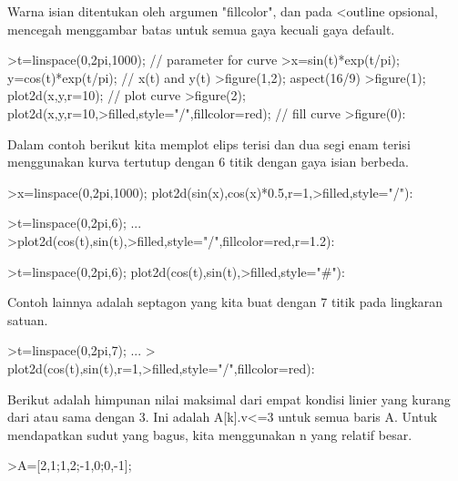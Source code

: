 \documentclass[a4paper,10pt]{article}
\begin{document}
\begin{eulernotebook}
\begin{eulercomment}
\begin{eulercomment}
\begin{eulercomment}
\begin{eulercomment}
\begin{eulercomment}
\begin{eulercomment}
\begin{eulercomment}
Warna isian ditentukan oleh argumen "fillcolor", dan pada \textless{}outline
opsional, mencegah menggambar batas untuk semua gaya kecuali gaya
default.
\end{eulercomment}
\begin{eulerprompt}
>t=linspace(0,2pi,1000); // parameter for curve
>x=sin(t)*exp(t/pi); y=cos(t)*exp(t/pi); // x(t) and y(t)
>figure(1,2); aspect(16/9)
>figure(1); plot2d(x,y,r=10); // plot curve
>figure(2); plot2d(x,y,r=10,>filled,style="/",fillcolor=red); // fill curve
>figure(0):
\end{eulerprompt}
\begin{eulercomment}
Dalam contoh berikut kita memplot elips terisi dan dua segi enam
terisi menggunakan kurva tertutup dengan 6 titik dengan gaya isian
berbeda.
\end{eulercomment}
\begin{eulerprompt}
>x=linspace(0,2pi,1000); plot2d(sin(x),cos(x)*0.5,r=1,>filled,style="/"):
\end{eulerprompt}
\begin{eulerprompt}
>t=linspace(0,2pi,6); ...
>plot2d(cos(t),sin(t),>filled,style="/",fillcolor=red,r=1.2):
\end{eulerprompt}
\begin{eulerprompt}
>t=linspace(0,2pi,6); plot2d(cos(t),sin(t),>filled,style="#"):
\end{eulerprompt}
\begin{eulercomment}
Contoh lainnya adalah septagon yang kita buat dengan 7 titik pada
lingkaran satuan.
\end{eulercomment}
\begin{eulerprompt}
>t=linspace(0,2pi,7);  ...
> plot2d(cos(t),sin(t),r=1,>filled,style="/",fillcolor=red):
\end{eulerprompt}
\begin{eulercomment}
Berikut adalah himpunan nilai maksimal dari empat kondisi linier yang
kurang dari atau sama dengan 3. Ini adalah A[k].v\textless{}=3 untuk semua baris
A. Untuk mendapatkan sudut yang bagus, kita menggunakan n yang relatif
besar.
\end{eulercomment}
\begin{eulerprompt}
>A=[2,1;1,2;-1,0;0,-1];

\end{eulerprompt}
\end{eulercomment}
\end{eulercomment}
\end{eulercomment}
\end{eulercomment}
\end{eulercomment}
\end{eulercomment}
\end{eulernotebook}
\end{document}
